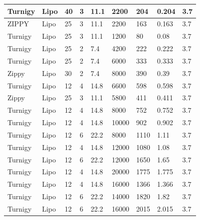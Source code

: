 \begin{appendices}
\begin{table}[H]
{\begin{tabular}{|l|l|l|l|l|l|l|l|l|}
Turnigy & Lipo & 40 & 3 & 11.1 & 2200 & 204 & 0.204 & 3.7 \\ \hline
ZIPPY & Lipo & 25 & 3 & 11.1 & 2200 & 163 & 0.163 & 3.7 \\ \hline
Turnigy & Lipo & 25 & 3 & 11.1 & 1200 & 80 & 0.08 & 3.7 \\ \hline
Turnigy & Lipo & 25 & 2 & 7.4 & 4200 & 222 & 0.222 & 3.7 \\ \hline
Turnigy & Lipo & 25 & 2 & 7.4 & 6000 & 333 & 0.333 & 3.7 \\ \hline
Zippy & Lipo & 30 & 2 & 7.4 & 8000 & 390 & 0.39 & 3.7 \\ \hline
Turnigy & Lipo & 12 & 4 & 14.8 & 6600 & 598 & 0.598 & 3.7 \\ \hline
Zippy & Lipo & 25 & 3 & 11.1 & 5800 & 411 & 0.411 & 3.7 \\ \hline
Turnigy & Lipo & 12 & 4 & 14.8 & 8000 & 752 & 0.752 & 3.7 \\ \hline
Turnigy & Lipo & 12 & 4 & 14.8 & 10000 & 902 & 0.902 & 3.7 \\ \hline
Turnigy & Lipo & 12 & 6 & 22.2 & 8000 & 1110 & 1.11 & 3.7 \\ \hline
Turnigy & Lipo & 12 & 4 & 14.8 & 12000 & 1080 & 1.08 & 3.7 \\ \hline
Turnigy & Lipo & 12 & 6 & 22.2 & 12000 & 1650 & 1.65 & 3.7 \\ \hline
Turnigy & Lipo & 12 & 4 & 14.8 & 20000 & 1775 & 1.775 & 3.7 \\ \hline
Turnigy & Lipo & 12 & 4 & 14.8 & 16000 & 1366 & 1.366 & 3.7 \\ \hline
Turnigy & Lipo & 12 & 6 & 22.2 & 14000 & 1820 & 1.82 & 3.7 \\ \hline
Turnigy & Lipo & 12 & 6 & 22.2 & 16000 & 2015 & 2.015 & 3.7 \\ \hline
\end{tabular}%
}
\end{table}


\end{appendices}
